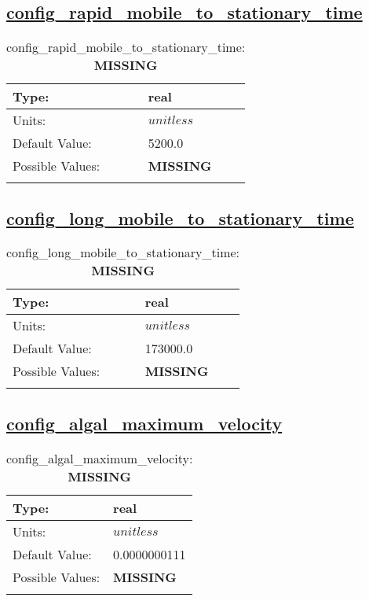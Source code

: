 \subsection[config\_rapid\_mobile\_to\_stationary\_time]{\hyperref[sec:nm_tab_biogeochemistry]{config\_rapid\_mobile\_to\_stationary\_time}}
\label{subsec:nm_sec_config_rapid_mobile_to_stationary_time}
\begin{center}
\begin{longtable}{| p{2.0in} || p{4.0in} |}
    \hline
    Type: & real \\
    \hline
    Units: & $unitless$ \\
    \hline
    Default Value: & 5200.0 \\
    \hline
    Possible Values: & {\bf \color{red} MISSING} \\
    \hline
    \caption{config\_rapid\_mobile\_to\_stationary\_time: {\bf \color{red} MISSING}}
\end{longtable}
\end{center}
\subsection[config\_long\_mobile\_to\_stationary\_time]{\hyperref[sec:nm_tab_biogeochemistry]{config\_long\_mobile\_to\_stationary\_time}}
\label{subsec:nm_sec_config_long_mobile_to_stationary_time}
\begin{center}
\begin{longtable}{| p{2.0in} || p{4.0in} |}
    \hline
    Type: & real \\
    \hline
    Units: & $unitless$ \\
    \hline
    Default Value: & 173000.0 \\
    \hline
    Possible Values: & {\bf \color{red} MISSING} \\
    \hline
    \caption{config\_long\_mobile\_to\_stationary\_time: {\bf \color{red} MISSING}}
\end{longtable}
\end{center}
\subsection[config\_algal\_maximum\_velocity]{\hyperref[sec:nm_tab_biogeochemistry]{config\_algal\_maximum\_velocity}}
\label{subsec:nm_sec_config_algal_maximum_velocity}
\begin{center}
\begin{longtable}{| p{2.0in} || p{4.0in} |}
    \hline
    Type: & real \\
    \hline
    Units: & $unitless$ \\
    \hline
    Default Value: & 0.0000000111 \\
    \hline
    Possible Values: & {\bf \color{red} MISSING} \\
    \hline
    \caption{config\_algal\_maximum\_velocity: {\bf \color{red} MISSING}}
\end{longtable}
\end{center}
